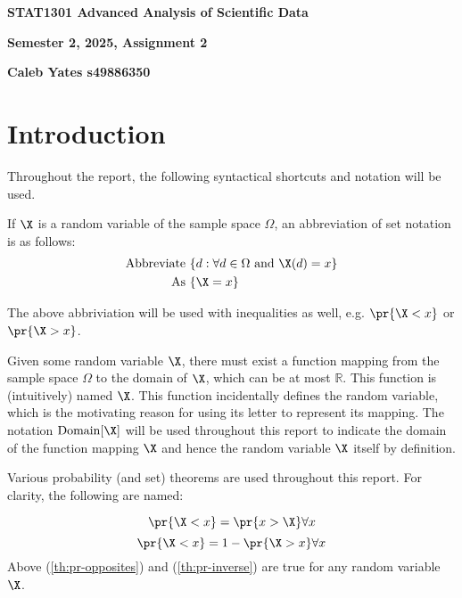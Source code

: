\begin{center}

{\Large  {\bf STAT1301 Advanced Analysis of Scientific Data}}
\medskip

{\large {\bf Semester 2, 2025, Assignment 2}}

\medskip

{\large {\bf Caleb Yates s49886350}}


\end{center}

\section*{Introduction}

Throughout the report, the following syntactical shortcuts and notation will be used.

If $\X$ is a random variable of the sample space $\Omega$, an abbreviation of set notation is as follows:
\begin{align*}
\text{Abbreviate	} & \{ d : \forall d \in \Omega \text{ and } \X(d) = x \} \\
\text{As	} & \{ \X = x \}
\end{align*}

The above abbriviation will be used with inequalities as well, e.g. $\pr{\X < x}$ or $\pr{\X > x}$.

Given some random variable $\X$, there must exist a function mapping from the sample space $\Omega$ to the domain of $\X$,
which can be at most $\mathbb{R}$. This function is (intuitively) named $\X$.
This function incidentally defines the random variable, which is the motivating reason for using its letter to represent its mapping.
The notation $\mathrm{Domain}[\X]$ will be used throughout this report to indicate the domain of the function mapping $\X$ and hence
the random variable $\X$ itself by definition.

Various probability (and set) theorems are used throughout this report. For clarity, the following are named:

\begin{equation} \label{th:pr-opposites}
\pr{\X < x} = \pr{x > \X} \forall x
\end{equation}
\begin{equation} \label{th:pr-inverse}
\pr{\X < x} = 1 - \pr{\X > x} \forall x
\end{equation}
Above (\ref{th:pr-opposites}) and (\ref{th:pr-inverse}) are true for any random variable $\X$.


